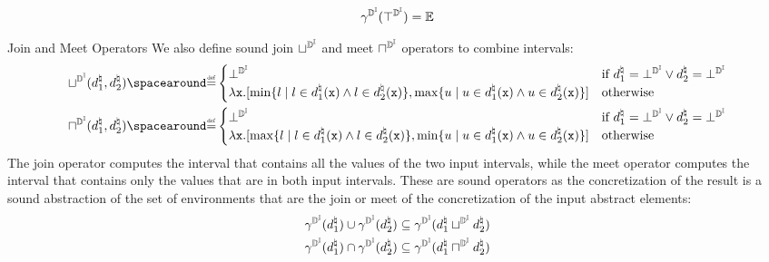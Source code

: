 \begin{description}
  \begin{align*}
    \gamma^{\mathbb{D}^{\mathbb{I}}}(\top^{\mathbb{D}^{\mathbb{I}}}) = \mathbb{E}
  \end{align*}
  \item{Join and Meet Operators}
  We also define sound join $\sqcup^{\mathbb{D}^{\mathbb{I}}}$ and meet $\sqcap^{\mathbb{D}^{\mathbb{I}}}$ operators to combine intervals:
  \begin{align*}
    \intervalabstractdomainjoin(\defabstractvalue_1, \defabstractvalue_2) &\DefeQ \begin{cases}
      \intervalabstractdomainbottom & \text{if } \defabstractvalue_1 = \intervalabstractdomainbottom \lor \defabstractvalue_2 = \intervalabstractdomainbottom \\
      \lambda \defvariable.\interval{\min\setdef{l}{l\in\defabstractvalue_1(\defvariable) \land l\in\defabstractvalue_2(\defvariable)}}{\max\setdef{u}{u\in\defabstractvalue_1(\defvariable) \land u\in\defabstractvalue_2(\defvariable)}} & \text{otherwise}
    \end{cases} \\
    \intervalabstractdomainmeet(\defabstractvalue_1, \defabstractvalue_2) &\DefeQ \begin{cases}
      \intervalabstractdomainbottom & \text{if } \defabstractvalue_1 = \intervalabstractdomainbottom \lor \defabstractvalue_2 = \intervalabstractdomainbottom \\
      \lambda \defvariable.\interval{\max\setdef{l}{l\in\defabstractvalue_1(\defvariable) \land l\in\defabstractvalue_2(\defvariable)}}{\min\setdef{u}{u\in\defabstractvalue_1(\defvariable) \land u\in\defabstractvalue_2(\defvariable)}} & \text{otherwise}
    \end{cases}
  \end{align*}
  The join operator computes the interval that contains all the values of the two input intervals, while the meet operator computes the interval that contains only the values that are in both input intervals. These are sound operators as the concretization of the result is a sound abstraction of the set of environments that are the join or meet of the concretization of the input abstract elements:
  \begin{align*}
    \gamma^{\mathbb{D}^{\mathbb{I}}}(d^\natural_1) \cup \gamma^{\mathbb{D}^{\mathbb{I}}}(d^\natural_2) &\subseteq \gamma^{\mathbb{D}^{\mathbb{I}}}(d^\natural_1 \sqcup^{\mathbb{D}^{\mathbb{I}}} d^\natural_2) \\
    \gamma^{\mathbb{D}^{\mathbb{I}}}(d^\natural_1) \cap \gamma^{\mathbb{D}^{\mathbb{I}}}(d^\natural_2) &\subseteq \gamma^{\mathbb{D}^{\mathbb{I}}}(d^\natural_1 \sqcap^{\mathbb{D}^{\mathbb{I}}} d^\natural_2)
  \end{align*}
  \item[Forward and Backward Assignments]
  \item[Boolean Expressions]
  \item[Widening]
  \item[Narrowing]
  \end{description}

